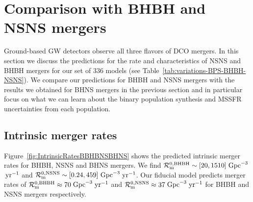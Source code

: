 \documentclass[twocolumn]{aastex63}
\newcommand\rate{\mathcal{R}}
\newcommand\bhnsSingle{BHNS\xspace}
\newcommand{\yearmin}{\ensuremath{\,\rm{yr}^{-1}}\xspace}
\newcommand{\GpcminThree}{\ensuremath{\,\rm{Gpc}^{-3}}\xspace}
\newcommand{\Nmodels}{\ensuremath{336}\xspace}
\newcommand{\RateIntrinsicAzeroBHBH}{\ensuremath{70}\xspace}
\newcommand{\RateIntrinsicAzeroNSNS}{\ensuremath{37}\xspace}
\newcommand{\RateIntrinsicAzeroBHBHmin}{\ensuremath{20}\xspace}
\newcommand{\RateIntrinsicAzeroBHBHmax}{\ensuremath{1510}\xspace}
\newcommand{\RateIntrinsicAzeroNSNSmin}{\ensuremath{0.24}\xspace}
\newcommand{\RateIntrinsicAzeroNSNSmax}{\ensuremath{459}\xspace}
\begin{document}
\section{Comparison with \ac{BHBH} and \ac{NSNS} mergers}
\label{sec:comparing-with-BHBH-and-NSNS}
%
Ground-based \ac{GW} detectors observe all three flavors of \ac{DCO} mergers. In this section we discuss the  predictions for the rate and characteristics of \ac{NSNS} and \ac{BHBH} mergers for our set of \Nmodels models (see Table~\ref{tab:variations-BPS-BHBH-NSNS}). We  compare our predictions for \ac{BHBH} and \ac{NSNS}  mergers with the results we obtained for \bhnsSingle mergers in the previous section and in particular focus on what we can learn about  the binary population synthesis  and \ac{MSSFR} uncertainties from each population. 




\subsection{Intrinsic merger rates}
\label{subsec:comparing-BBH-BNS-intrinsic-rates}
%
Figure~\ref{fig:IntrinsicRatesBBHBNSBHNS} shows the predicted intrinsic merger rates for BHBH, \ac{NSNS} and \bhnsSingle mergers. 
We find $\rate_{\rm{m}}^{0,\rm{BHBH}} \sim [ \RateIntrinsicAzeroBHBHmin,  \RateIntrinsicAzeroBHBHmax]$\GpcminThree \yearmin and   $\rate_{\rm{m}}^{0,\rm{NSNS}} \sim [ \RateIntrinsicAzeroNSNSmin,  \RateIntrinsicAzeroNSNSmax]$\GpcminThree \yearmin. Our fiducial model predicts merger rates of  $\rate_{\rm{m}}^{0,\rm{BHBH}} \approx  \RateIntrinsicAzeroBHBH$\GpcminThree \yearmin and  $\rate_{\rm{m}}^{0,\rm{NSNS}} \approx  \RateIntrinsicAzeroNSNS$\GpcminThree \yearmin for \ac{BHBH} and \ac{NSNS} mergers respectively. 
\end{document}
